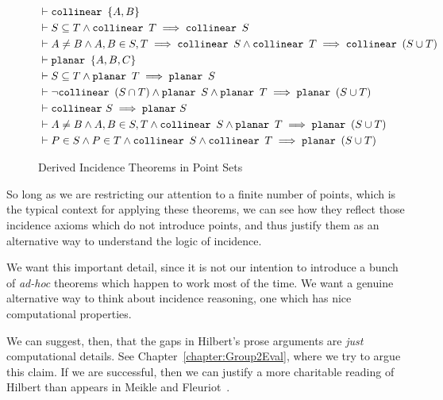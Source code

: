 \begin{figure}
\begin{align}
&\vdash\texttt{collinear}\ \, \{A,B\} \label{rule:colltwo}\\
&\vdash S \subseteq T \wedge \texttt{collinear}\ \, T \implies \texttt{collinear}\ \, S
  \label{rule:collsubset}\\
&\vdash A \neq B \wedge A,B \in S,T \implies \texttt{collinear}\ \, S \wedge \texttt{collinear}\ \, T \implies \texttt{collinear}\ \, (S \cup T) \label{rule:collunion}\\
&\vdash\texttt{planar}\ \, \{A,B,C\} \label{rule:planethree}\\
&\vdash S \subseteq T \wedge \texttt{planar}\ \, T \implies \texttt{planar}\ \, S
  \label{rule:planesubset}\\
&\vdash\neg\texttt{collinear}\ \, (S \cap T) \wedge \texttt{planar}\ \, S \wedge \texttt{planar}\ \, T \implies \texttt{planar}\ \, (S \cup T) \label{rule:planeunion}\\
&\vdash\texttt{collinear}\  S \implies \texttt{planar}\  S \label{rule:collplane}\\
&\vdash A \neq B \wedge A,B \in S,T \wedge \texttt{collinear}\ \, S \wedge \texttt{planar}\ \, T \implies \texttt{planar}\ \, (S \cup T) \label{rule:collplaneplane}\\
&\vdash P \in S \wedge P \in T \wedge \texttt{collinear}\ \, S \wedge \texttt{collinear}\ \, T \implies \texttt{planar}\ \, (S \cup T) \label{rule:collcollplane}
\end{align}
\caption{Derived Incidence Theorems in Point Sets}\label{fig:PointSets}
\end{figure}

So long as we are restricting our attention to a finite number of points, which is the typical context for applying these theorems, we can see how they reflect those incidence axioms which do not introduce points, and thus justify them as an alternative way to understand the logic of incidence. 

We want this important detail, since it is not our intention to introduce a bunch of \emph{ad-hoc} theorems which happen to work most of the time. We want a genuine alternative way to think about incidence reasoning, one which has nice computational properties.

We can suggest, then, that the gaps in Hilbert's prose arguments are \emph{just} computational details. See Chapter~\ref{chapter:Group2Eval}, where we try to argue this claim. If we are successful, then we can justify a more charitable reading of Hilbert than appears in Meikle and Fleuriot~\cite{MeikleFleuriotFormalizingHilbert}. 

